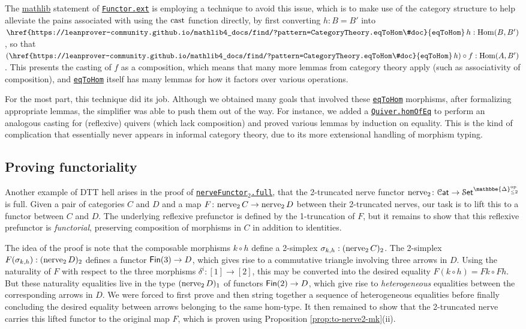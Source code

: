 \documentclass[a4paper,UKenglish,cleveref, autoref, thm-restate]{lipics-v2021}
\newcommand{\op}{\textup{op}}
\newcommand{\nerve}{\textup{nerve}}
\newcommand{\cast}{\textup{cast}}
\newcommand{\Hom}{\textup{Hom}}
\newcommand{\cat}[1]{\textup{\textsf{#1}}}%
\newcommand{\1}{\mathbbe{1}}
\newcommand{\2}{\mathbbe{2}}
\newcommand{\3}{\mathbbe{3}}
\newcommand{\DDelta}{\mathbbe{\Delta}}
\newcommand{\Fin}{\cat{Fin}}
\newcommand{\Cat}{\mathcal{C}\cat{at}}
\newcommand{\Set}{\mathcal{S}\cat{et}}
\newcommand{\libmathlib}{\href{https://github.com/leanprover-community/mathlib}{\textsf{mathlib}}}
\newcommand{\ldoc}[2][]{\href{https://leanprover-community.github.io/mathlib4_docs/find/?pattern=#1#2\#doc}{\texttt{#2}}}
\newcommand{\cdoc}[2][]{\href{https://leanprover-community.github.io/mathlib4_docs/find/?pattern=CategoryTheory.#1#2\#doc}{\texttt{#2}}}
\newcommand{\cdocTwo}[3][]{\href{https://leanprover-community.github.io/mathlib4_docs/find/?pattern=CategoryTheory.#1#2\%E2\%82\%82#3\#doc}{\texttt{#2${}_2$#3}}}
\begin{document}
The \libmathlib{} statement of \cdoc{Functor.ext} is employing a technique to avoid this issue, which is to make use of the category structure to help alleviate the pains associated with using the $\cast$ function directly, by first converting $h:B=B'$ into $\cdoc{eqToHom}\,h:\Hom(B,B')$, so that $(\cdoc{eqToHom}\,h) \circ f:\Hom(A,B')$. This presents the casting of $f$ as a composition, which means that many more lemmas from category theory apply (such as associativity of composition), and \cdoc{eqToHom} itself has many lemmas for how it factors over various operations.

For the most part, this technique did its job. Although we obtained many goals that involved these \cdoc{eqToHom} morphisms, after formalizing appropriate lemmas, the simplifier was able to push them out of the way. For instance, we added a \ldoc{Quiver.homOfEq} to perform an analogous casting for (reflexive) quivers (which lack composition) and proved various lemmas by induction on equality. This is the kind of complication that essentially never appears in informal category theory, due to its more extensional handling of morphism typing.


\subsection{Proving functoriality}\label{sec:full}

Another example of DTT hell arises in the proof of \cdocTwo{nerveFunctor}{.full}, that the 2-truncated nerve functor $\nerve_2\colon \Cat \to \Set^{\DDelta_{\leq 2}^\op}$ is full. Given a pair of categories $C$ and $D$ and a map $F \colon \nerve_2\, C \to \nerve_2\, D$ between their 2-truncated nerves, our task is to lift this to a functor between $C$ and $D$. The underlying reflexive prefunctor is defined by the 1-truncation of $F$, but it remains to show that this reflexive prefunctor is \emph{functorial}, preserving composition of morphisms in $C$ in addition to identities.

The idea of the proof is note that the composable morphisms $k \circ h$ define a 2-simplex $\sigma_{k,h} : (\nerve_2\,C)_2$. The 2-simplex $F(\sigma_{k,h}) : (\nerve_2\,D)_2$ defines a functor $\Fin(3) \to D$, which gives rise to a commutative triangle involving three arrows in $D$. Using the naturality of $F$ with respect to the three morphisms $\delta^i \colon [1] \to [2]$, this may be converted into the desired equality $F(k \circ h) = Fk \circ Fh$. But these naturality equalities live in the type $(\nerve_2\,D)_1$ of functors $\Fin(2) \to D$, which give rise to \emph{heterogeneous} equalities between the corresponding arrows in $D$. We were forced to first prove and then string together a sequence of heterogeneous equalities before finally concluding the desired equality between arrows belonging to the same hom-type. It then remained to show that the 2-truncated nerve carries this lifted functor to the original map $F$, which is proven using Proposition \ref{prop:to-nerve2-mk}(ii).
\end{document}
